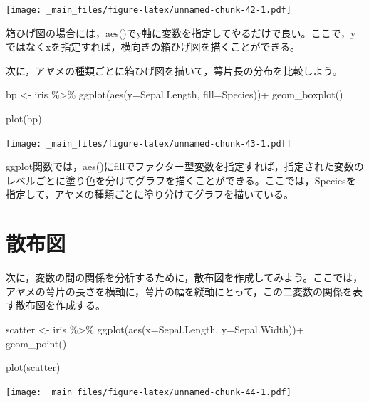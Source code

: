 \documentclass[
]{book}
\newenvironment{Shaded}{\begin{snugshade}}{\end{snugshade}}
\newcommand{\AttributeTok}[1]{\textcolor[rgb]{0.77,0.63,0.00}{#1}}
\newcommand{\FunctionTok}[1]{\textcolor[rgb]{0.00,0.00,0.00}{#1}}
\newcommand{\NormalTok}[1]{#1}
\newcommand{\OtherTok}[1]{\textcolor[rgb]{0.56,0.35,0.01}{#1}}
\newcommand{\SpecialCharTok}[1]{\textcolor[rgb]{0.00,0.00,0.00}{#1}}
\begin{document}
\texttt{[image: \_main\_files/figure-latex/unnamed-chunk-42-1.pdf]}

箱ひげ図の場合には，aes()でy軸に変数を指定してやるだけで良い。ここで，yではなくxを指定すれば，横向きの箱ひげ図を描くことができる。

次に，アヤメの種類ごとに箱ひげ図を描いて，萼片長の分布を比較しよう。

\begin{Shaded}
\begin{Highlighting}[]
\NormalTok{bp }\OtherTok{\textless{}{-}}\NormalTok{ iris }\SpecialCharTok{\%\textgreater{}\%} 
  \FunctionTok{ggplot}\NormalTok{(}\FunctionTok{aes}\NormalTok{(}\AttributeTok{y=}\NormalTok{Sepal.Length, }\AttributeTok{fill=}\NormalTok{Species))}\SpecialCharTok{+}
  \FunctionTok{geom\_boxplot}\NormalTok{()}

\FunctionTok{plot}\NormalTok{(bp)}
\end{Highlighting}
\end{Shaded}

\texttt{[image: \_main\_files/figure-latex/unnamed-chunk-43-1.pdf]}

ggplot関数では，aes()にfillでファクター型変数を指定すれば，指定された変数のレベルごとに塗り色を分けてグラフを描くことができる。ここでは，Speciesを指定して，アヤメの種類ごとに塗り分けてグラフを描いている。

\hypertarget{ux6563ux5e03ux56f3}{%
\section{散布図}\label{ux6563ux5e03ux56f3}}

次に，変数の間の関係を分析するために，散布図を作成してみよう。ここでは，アヤメの萼片の長さを横軸に，萼片の幅を縦軸にとって，この二変数の関係を表す散布図を作成する。

\begin{Shaded}
\begin{Highlighting}[]
\NormalTok{scatter }\OtherTok{\textless{}{-}}\NormalTok{ iris }\SpecialCharTok{\%\textgreater{}\%} 
  \FunctionTok{ggplot}\NormalTok{(}\FunctionTok{aes}\NormalTok{(}\AttributeTok{x=}\NormalTok{Sepal.Length, }\AttributeTok{y=}\NormalTok{Sepal.Width))}\SpecialCharTok{+}
  \FunctionTok{geom\_point}\NormalTok{()}

\FunctionTok{plot}\NormalTok{(scatter)}
\end{Highlighting}
\end{Shaded}

\texttt{[image: \_main\_files/figure-latex/unnamed-chunk-44-1.pdf]}
\end{document}
